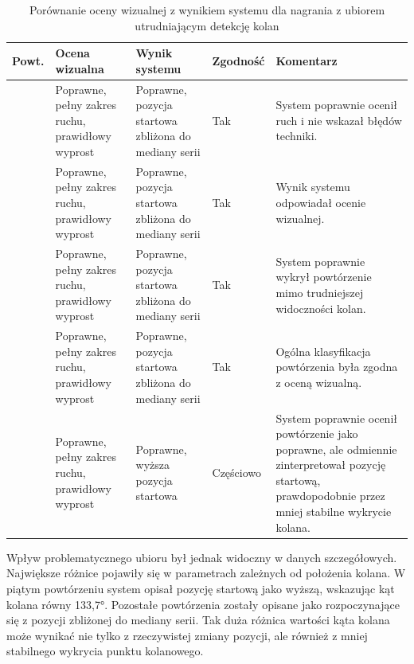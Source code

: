 \begin{table}[H]
\centering
\caption{Porównanie oceny wizualnej z wynikiem systemu dla nagrania z ubiorem utrudniającym detekcję kolan}
\label{tab:porownanie-ubior-kolana}
\footnotesize
\renewcommand{\arraystretch}{1.08}
\setlength{\tabcolsep}{2.5pt}
\begin{tabular}{|
>{\centering\arraybackslash}p{1.05cm}|
>{\raggedright\arraybackslash}p{4.15cm}|
>{\raggedright\arraybackslash}p{4.05cm}|
>{\centering\arraybackslash}p{1.55cm}|
>{\raggedright\arraybackslash}p{3.85cm}|}
\hline
\textbf{Powt.} & \textbf{Ocena wizualna} & \textbf{Wynik systemu} & \textbf{Zgodność} & \textbf{Komentarz} \\ \hline
1 & Poprawne, pełny zakres ruchu, prawidłowy wyprost & Poprawne, pozycja startowa zbliżona do mediany serii & Tak & System poprawnie ocenił ruch i nie wskazał błędów techniki. \\ \hline
2 & Poprawne, pełny zakres ruchu, prawidłowy wyprost & Poprawne, pozycja startowa zbliżona do mediany serii & Tak & Wynik systemu odpowiadał ocenie wizualnej. \\ \hline
3 & Poprawne, pełny zakres ruchu, prawidłowy wyprost & Poprawne, pozycja startowa zbliżona do mediany serii & Tak & System poprawnie wykrył powtórzenie mimo trudniejszej widoczności kolan. \\ \hline
4 & Poprawne, pełny zakres ruchu, prawidłowy wyprost & Poprawne, pozycja startowa zbliżona do mediany serii & Tak & Ogólna klasyfikacja powtórzenia była zgodna z oceną wizualną. \\ \hline
5 & Poprawne, pełny zakres ruchu, prawidłowy wyprost & Poprawne, wyższa pozycja startowa & Częściowo & System poprawnie ocenił powtórzenie jako poprawne, ale odmiennie zinterpretował pozycję startową, prawdopodobnie przez mniej stabilne wykrycie kolana. \\ \hline
\end{tabular}
\end{table}

Wpływ problematycznego ubioru był jednak widoczny w danych szczegółowych. Największe różnice pojawiły się w parametrach zależnych od położenia kolana. W piątym powtórzeniu system opisał pozycję startową jako wyższą, wskazując kąt kolana równy 133{,}7°. Pozostałe powtórzenia zostały opisane jako rozpoczynające się z pozycji zbliżonej do mediany serii. Tak duża różnica wartości kąta kolana może wynikać nie tylko z rzeczywistej zmiany pozycji, ale również z mniej stabilnego wykrycia punktu kolanowego.

